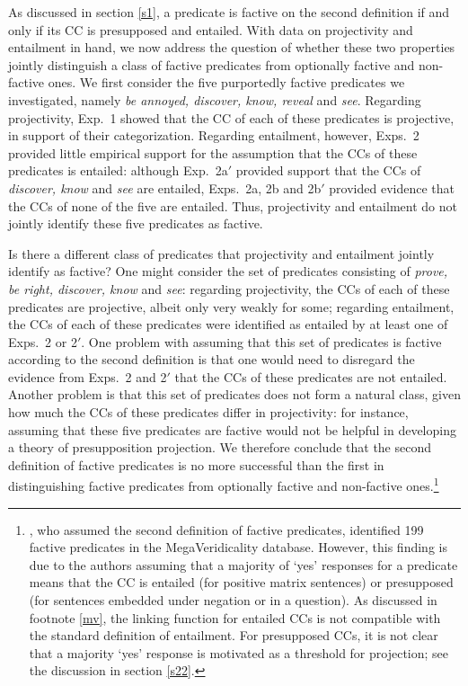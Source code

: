 \documentclass[11pt,fleqn]{article}
\newcommand{\6}{\mbox{$[\hspace*{-.6mm}[$}}
\newcommand{\9}{\mbox{$]\hspace*{-.6mm}]$}}
\begin{document}
{As discussed in section \ref{s1}, a predicate is factive on the second definition if and only if its CC is presupposed and entailed. With data on projectivity and entailment in hand, we now address the question of whether these two properties jointly distinguish a class of factive predicates from optionally factive and non-factive ones. We first consider the five purportedly factive predicates we investigated, namely {\em be annoyed, discover, know, reveal} and {\em see}. Regarding projectivity, Exp.~1 showed that the CC of each of these predicates is projective, in support of their categorization. Regarding entailment, however, Exps.~2 provided little empirical support for the assumption that the CCs of these predicates is entailed: although Exp.~2a$'$ provided support that the CCs of {\em discover, know} and {\em see} are entailed, Exps.~2a, 2b and 2b$'$ provided evidence that the CCs of none of the five are entailed. Thus, projectivity and entailment do not jointly identify these five predicates as factive.

Is there a different class of predicates that projectivity and entailment jointly identify as factive? One might consider the set of predicates consisting of {\em  prove, be right, discover, know} and {\em see}: regarding projectivity, the CCs of each of these predicates are projective, albeit only very weakly for some; regarding entailment, the CCs of each of these predicates were identified as entailed by at least one of Exps.~2 or 2$'$. One problem with assuming that this set of predicates is factive according to the second definition is that one would need to disregard the evidence from Exps.~2 and 2$'$ that the CCs of these predicates are not entailed. Another problem is that this set of predicates does not form a natural class, given how much the CCs of these predicates differ in projectivity: for instance, assuming that these five predicates are factive would not be helpful in developing a theory of presupposition projection. We therefore conclude that the second definition of factive predicates is no more successful than the first in distinguishing factive predicates from optionally factive and non-factive ones.\footnote{\citet{white-rawlins-nels2018}, who assumed the second definition of factive predicates, identified 199 factive predicates in the MegaVeridicality database. However,  this finding is due to the authors assuming that a majority of `yes' responses for a predicate means that the CC is entailed (for positive matrix sentences) or presupposed (for sentences embedded under negation or in a question). As discussed in footnote \ref{mv}, the linking function for entailed CCs is not compatible with the standard definition of entailment. For presupposed CCs, it is not clear that a majority `yes' response is motivated as a threshold for projection; see the discussion in section \ref{s22}.} 

}
\end{document}
